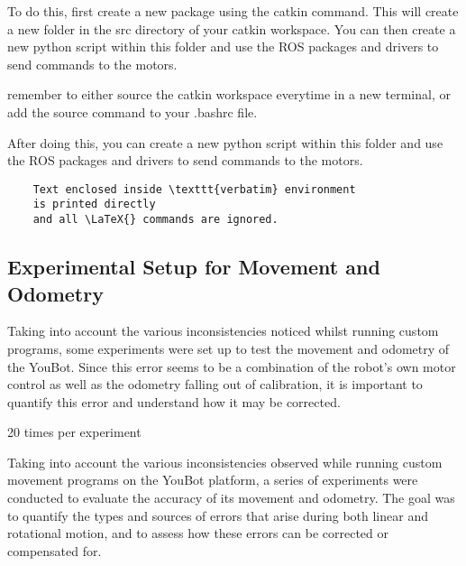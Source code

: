 \documentclass[a4paper, 12pt]{article}
\newif\ifshownotes
\newcommand{\notes}[1]{\ifshownotes\textcolor{blue}{#1}\fi}
\begin{document}
    To do this, first create a new package using the catkin command. This will create a new folder in the src directory of your catkin workspace. You can then create a new python script within this folder and use the ROS packages and drivers to send commands to the motors.

    remember to either source the catkin workspace everytime in a new terminal, or add the source command to your .bashrc file.

    After doing this, you can create a new python script within this folder and use the ROS packages and drivers to send commands to the motors. 

    

    \begin{verbatim}
    Text enclosed inside \texttt{verbatim} environment 
    is printed directly 
    and all \LaTeX{} commands are ignored.
    \end{verbatim}


   
    \pagebreak

    \subsection{Experimental Setup for Movement and Odometry}

    \notes{here, ill discuss the experimental setup for testing movement and odometry.  this should include the two experiments of moving linearly and rotating, and discuss how error is calculated. probably discuss negative feedback and PID control as well, random, percentage, consistent error, etc.}

    Taking into account the various inconsistencies noticed whilst running custom programs, some experiments were set up to test the movement and odometry of the YouBot. Since this error seems to be a combination of the robot's own motor control as well as the odometry falling out of calibration, it is important to quantify this error and understand how it may be corrected. 



    \notes{different speeds? proportional or fixed error? does the odometry also drift?}

    20 times per experiment

    Taking into account the various inconsistencies observed while running custom movement programs on the YouBot platform, a series of experiments were conducted to evaluate the accuracy of its movement and odometry. The goal was to quantify the types and sources of errors that arise during both linear and rotational motion, and to assess how these errors can be corrected or compensated for.
\end{document}
